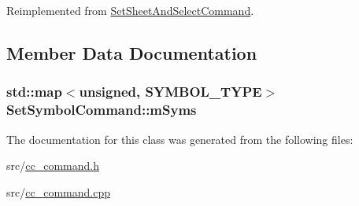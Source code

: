 Reimplemented from \hyperlink{a00132_ae017079a0a6c65222f10968fad8fc082}{Set\-Sheet\-And\-Select\-Command}.



\subsection{Member Data Documentation}
\hypertarget{a00137_a7e3ba2cc3c4894e6189a075c1147348f}{
\subsubsection[{m\-Syms}]{\setlength{\rightskip}{0pt plus 5cm}std\-::map$<$unsigned, {\bf S\-Y\-M\-B\-O\-L\-\_\-\-T\-Y\-P\-E}$>$ Set\-Symbol\-Command\-::m\-Syms\hspace{0.3cm}{\ttfamily [protected]}}}\label{a00137_a7e3ba2cc3c4894e6189a075c1147348f}


The documentation for this class was generated from the following files\-:\begin{DoxyCompactItemize}
\item 
src/\hyperlink{a00183}{cc\-\_\-command.\-h}\item 
src/\hyperlink{a00182}{cc\-\_\-command.\-cpp}\end{DoxyCompactItemize}
